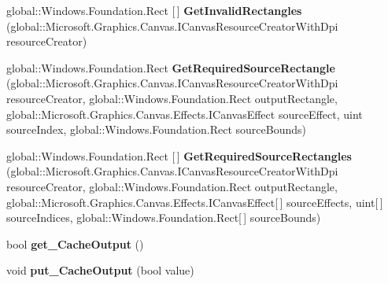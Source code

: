 \begin{DoxyCompactItemize}
global\+::\+Windows.\+Foundation.\+Rect \mbox{[}$\,$\mbox{]} {\bfseries Get\+Invalid\+Rectangles} (global\+::\+Microsoft.\+Graphics.\+Canvas.\+I\+Canvas\+Resource\+Creator\+With\+Dpi resource\+Creator)
\item 
\mbox{\label{interface_microsoft_1_1_graphics_1_1_canvas_1_1_effects_1_1_i_canvas_effect_af3c9446ecd22ba8c78ef3a8a382d21c3}} 
global\+::\+Windows.\+Foundation.\+Rect {\bfseries Get\+Required\+Source\+Rectangle} (global\+::\+Microsoft.\+Graphics.\+Canvas.\+I\+Canvas\+Resource\+Creator\+With\+Dpi resource\+Creator, global\+::\+Windows.\+Foundation.\+Rect output\+Rectangle, global\+::\+Microsoft.\+Graphics.\+Canvas.\+Effects.\+I\+Canvas\+Effect source\+Effect, uint source\+Index, global\+::\+Windows.\+Foundation.\+Rect source\+Bounds)
\item 
\mbox{\label{interface_microsoft_1_1_graphics_1_1_canvas_1_1_effects_1_1_i_canvas_effect_a164d8438529055d00d8f6ed3b12c4539}} 
global\+::\+Windows.\+Foundation.\+Rect \mbox{[}$\,$\mbox{]} {\bfseries Get\+Required\+Source\+Rectangles} (global\+::\+Microsoft.\+Graphics.\+Canvas.\+I\+Canvas\+Resource\+Creator\+With\+Dpi resource\+Creator, global\+::\+Windows.\+Foundation.\+Rect output\+Rectangle, global\+::\+Microsoft.\+Graphics.\+Canvas.\+Effects.\+I\+Canvas\+Effect\mbox{[}$\,$\mbox{]} source\+Effects, uint\mbox{[}$\,$\mbox{]} source\+Indices, global\+::\+Windows.\+Foundation.\+Rect\mbox{[}$\,$\mbox{]} source\+Bounds)
\item 
\mbox{\label{interface_microsoft_1_1_graphics_1_1_canvas_1_1_effects_1_1_i_canvas_effect_ade35aa78196aaa6fe9447696abb6d07f}} 
bool {\bfseries get\+\_\+\+Cache\+Output} ()
\item 
\mbox{\label{interface_microsoft_1_1_graphics_1_1_canvas_1_1_effects_1_1_i_canvas_effect_a83327dc0bb363f6f878802f5c971c033}} 
void {\bfseries put\+\_\+\+Cache\+Output} (bool value)
\item 
\mbox{\label{interface_microsoft_1_1_graphics_1_1_canvas_1_1_effects_1_1_i_canvas_effect_acbbcd7b5f2c9c1556c6ae4851cb48afa}} 

\end{DoxyCompactItemize}
